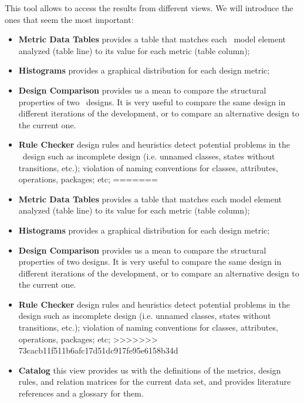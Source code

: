 This tool allows to access the results from different views. We will introduce the ones that seem the most important:
\begin{itemize}
<<<<<<< HEAD
\item \textbf{Metric Data Tables} provides a table that matches each \uml\ model element analyzed (table line) to its value for each metric (table column);
\item \textbf{Histograms} provides a graphical distribution  for each design metric;
\item \textbf{Design Comparison} provides us a mean to compare the structural properties of two \uml\ designs. It is very useful to compare the same design in different iterations of the development, or to compare an alternative design to the current one.
\item \textbf{Rule Checker} design rules and heuristics detect potential problems in the \uml\ design such as incomplete design (i.e. unnamed classes, states without transitions, etc.);  violation of naming conventions for classes, attributes, operations, packages; etc;
=======
\item \textbf{Metric Data Tables} provides a table that matches each \umlS model element analyzed (table line) to its value for each metric (table column);
\item \textbf{Histograms} provides a graphical distribution  for each design metric;
\item \textbf{Design Comparison} provides us a mean to compare the structural properties of two \umlS designs. It is very useful to compare the same design in different iterations of the development, or to compare an alternative design to the current one.
\item \textbf{Rule Checker} design rules and heuristics detect potential problems in the \umlS design such as incomplete design (i.e. unnamed classes, states without transitions, etc.);  violation of naming conventions for classes, attributes, operations, packages; etc;
>>>>>>> 73cacb11f511b6afc17d51dc917fe95e6158b34d

\item \textbf{Catalog} this view provides us with the definitions of the metrics, design rules, and relation matrices for the current data set, and provides literature references and a glossary for them.
\end{itemize}


